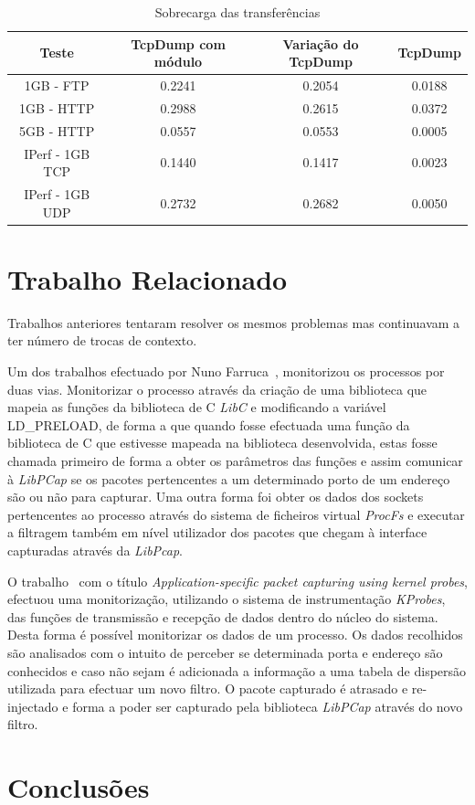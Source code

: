 \documentclass[a4paper]{llncs}
\begin{document}
\begin{table}
\begin{center}
\caption{Sobrecarga das transferências}
\begin{tabular}{ | c | c | c | c | }
\hline
Teste & TcpDump com módulo & Variação do TcpDump & \hspace {0.3cm} TcpDump \hspace {0.3cm}\\

\hline
1GB - FTP  & 0.2241 & 0.2054 & 0.0188 \\
1GB - HTTP &  0.2988 & 0.2615 & 0.0372 \\
5GB - HTTP &  0.0557 & 0.0553 & 0.0005 \\
IPerf - 1GB TCP &  0.1440 & 0.1417 & 0.0023 \\
IPerf - 1GB UDP & 0.2732 & 0.2682 & 0.0050 \\
\hline
\end{tabular}
\end{center}
\end{table}

\section{Trabalho Relacionado}
\label{sec:related_work}
Trabalhos anteriores tentaram resolver os mesmos problemas mas continuavam a ter número de trocas de contexto.

Um dos trabalhos efectuado por Nuno Farruca~\cite{Farruca:2009,duarte10}, monitorizou os processos por duas vias. Monitorizar o processo através da criação de uma biblioteca que mapeia as funções da biblioteca de C \textit{LibC} e modificando a variável LD\_PRELOAD, de forma a que quando fosse efectuada uma função da biblioteca de C que estivesse mapeada na biblioteca desenvolvida, estas fosse chamada primeiro de forma a obter os parâmetros das funções e assim comunicar à \textit{LibPCap} se os pacotes pertencentes a um determinado porto de um endereço são ou não para capturar. Uma outra forma foi obter os dados dos sockets pertencentes ao processo através do sistema de ficheiros virtual \textit{ProcFs} e executar a filtragem também em nível utilizador dos pacotes que chegam à interface capturadas através da \textit{LibPcap}.

O trabalho~\cite{1688981} com o título \textit{Application-specific packet capturing using kernel probes}, efectuou uma monitorização, utilizando o sistema de instrumentação \textit{KProbes}, das funções de transmissão e recepção de dados dentro do núcleo do sistema. Desta forma é possível monitorizar os dados de um processo. Os dados recolhidos são analisados com o intuito de perceber se determinada porta e endereço são conhecidos e caso não sejam é adicionada a informação a uma tabela de dispersão utilizada para efectuar um novo filtro. O pacote capturado  é atrasado e re-injectado e forma a poder ser capturado pela biblioteca \textit{LibPCap} através do novo filtro.

\section{Conclusões}
\label{sec:conclusions}




\end{document}

